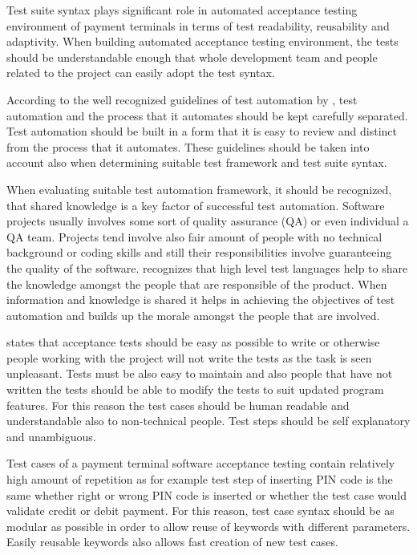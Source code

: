 Test suite syntax plays significant role in automated acceptance testing environment of payment terminals in terms of test readability, reusability and adaptivity. When building automated acceptance testing environment, the tests should be understandable enough that whole development team and people related to the project can easily adopt the test syntax.

According to the well recognized guidelines of test automation by \emph{\cite{snakeoil}}, test automation and the process that it automates should be kept carefully separated. Test automation should be built in a form that it is easy to review and distinct from the process that it automates. These guidelines should be taken into account also when determining suitable test framework and test suite syntax.

When evaluating suitable test automation framework, it should be recognized, that shared knowledge is a key factor of successful test automation. Software projects usually involves some sort of quality assurance (QA) or even individual a QA team. Projects tend involve also fair amount of people with no technical background or coding skills and still their responsibilities involve guaranteeing the quality of the software. \emph{\cite{just_enough}} recognizes that high level test languages help to share the knowledge amongst the people that are responsible of the product. When information and knowledge is shared it helps in achieving the objectives of test automation and builds up the morale amongst the people that are involved.

\emph{\cite{lowell2003successful}} states that acceptance tests should be easy as possible to write or otherwise people working with the project will not write the tests as the task is seen unpleasant. Tests must be also easy to maintain and also people that have not written the tests should be able to modify the tests to suit updated program features. For this reason the test cases should be human readable and understandable also to non-technical people. Test steps should be self explanatory and unambiguous.

Test cases of a payment terminal software acceptance testing contain relatively high amount of repetition as for example test step of inserting PIN code is the same whether right or wrong PIN code is inserted or whether the test case would validate credit or debit payment. For this reason, test case syntax should be as modular as possible in order to allow reuse of keywords with different parameters. Easily reusable keywords also allows fast creation of new test cases.

